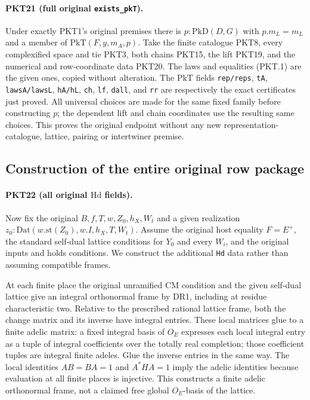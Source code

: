 \paragraph{PKT21 (full original \texttt{exists\_pkT}).}\label{claim:PKT21}
Under exactly PKT1's original premises there is $p:\mathrm{PkD}(D,G)$
with $p.m_L=m_L$ and a member of $\mathrm{PkT}(F,y,m_A,p)$.
Take the finite catalogue PKT8, every complexified space and tie PKT3,
both chains PKT15, the lift PKT19, and the numerical and row-coordinate
data PKT20.  The laws and equalities (PKT.1) are the given ones, copied
without alteration.  The $\mathrm{PkT}$ fields \texttt{rep/reps},
\texttt{tA}, \texttt{lawsA/lawsL}, \texttt{hA/hL}, \texttt{ch},
\texttt{lf}, \texttt{dall}, and \texttt{rr} are respectively the exact
certificates just proved.  All universal choices are made for the same
fixed family before constructing $p$; the dependent lift and chain
coordinates use the resulting same choices.  This proves the original
endpoint without any new representation-catalogue, lattice, pairing or
intertwiner premise.

\subsection{Construction of the entire original row package}

\paragraph{PKT22 (all original $\mathrm{Hd}$ fields).}\label{claim:PKT22}
Now fix the original $B,f,T,w,Z_0,h_X,W_t$ and a given realization
$z_0:\mathrm{Dat}(w.\mathrm{st}(Z_0),w.I,h_X,T,W_t)$.
Assume the original host equality $F=E^+$, the standard self-dual lattice
conditions for $Y_0$ and every $W_i$, and the original inputs and holds
conditions.  We construct the additional \texttt{Hd} data rather than
assuming compatible frames.

At each finite place the original unramified CM condition and the given
self-dual lattice give an integral orthonormal frame by DR1, including at
residue characteristic two.  Relative to the prescribed rational lattice
frame, both the change matrix and its inverse have integral entries.
These local matrices glue to a finite adelic matrix: a fixed integral basis
of $O_E$ expresses each local integral entry as a tuple of integral
coefficients over the totally real completion; those coefficient tuples
are integral finite adeles.  Glue the inverse entries in the same way.
The local identities $AB=BA=1$ and $A^*HA=1$ imply the adelic identities
because evaluation at all finite places is injective.  This constructs a
finite adelic orthonormal frame, not a claimed free global $O_E$-basis of
the lattice.

